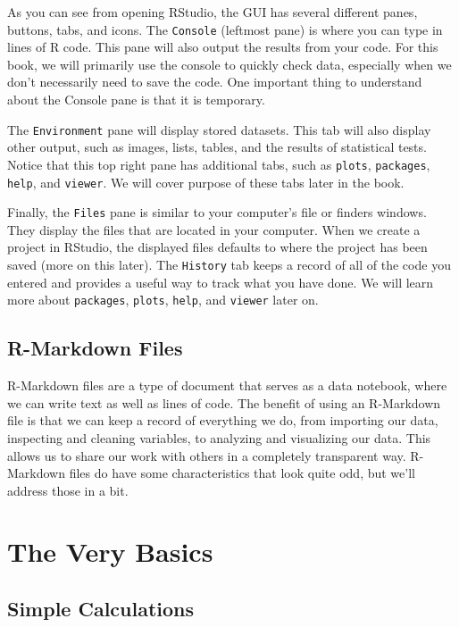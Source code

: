 \documentclass[
]{book}
\begin{document}
As you can see from opening RStudio, the GUI has several different panes, buttons, tabs, and icons. The \texttt{Console} (leftmost pane) is where you can type in lines of R code. This pane will also output the results from your code. For this book, we will primarily use the console to quickly check data, especially when we don't necessarily need to save the code. One important thing to understand about the Console pane is that it is temporary.

The \texttt{Environment} pane will display stored datasets. This tab will also display other output, such as images, lists, tables, and the results of statistical tests. Notice that this top right pane has additional tabs, such as \texttt{plots}, \texttt{packages}, \texttt{help}, and \texttt{viewer}. We will cover purpose of these tabs later in the book.

Finally, the \texttt{Files} pane is similar to your computer's file or finders windows. They display the files that are located in your computer. When we create a project in RStudio, the displayed files defaults to where the project has been saved (more on this later). The \texttt{History} tab keeps a record of all of the code you entered and provides a useful way to track what you have done. We will learn more about \texttt{packages}, \texttt{plots}, \texttt{help}, and \texttt{viewer} later on.

\hypertarget{r-markdown-files}{%
\subsection{R-Markdown Files}\label{r-markdown-files}}

R-Markdown files are a type of document that serves as a data notebook, where we can write text as well as lines of code. The benefit of using an R-Markdown file is that we can keep a record of everything we do, from importing our data, inspecting and cleaning variables, to analyzing and visualizing our data. This allows us to share our work with others in a completely transparent way. R-Markdown files do have some characteristics that look quite odd, but we'll address those in a bit.

\hypertarget{the-very-basics}{%
\section{The Very Basics}\label{the-very-basics}}

\hypertarget{simple-calculations}{%
\subsection{Simple Calculations}\label{simple-calculations}}
\end{document}
